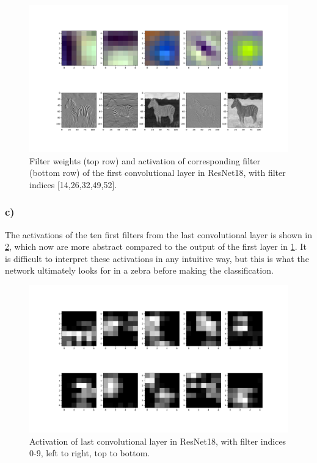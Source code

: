 \begin{figure}[h!]
  \centering
  \includegraphics[clip,trim=4cm 2cm 4cm 2cm, width=\textwidth]{figures/Task4b.pdf}
  \caption{Filter weights (top row) and activation of corresponding filter (bottom row) of the first convolutional layer in ResNet18, with filter indices [14,26,32,49,52].}
  \label{fig:task4:b}
\end{figure}



\subsubsection*{c)}

The activations of the ten first filters from the last convolutional layer is shown in \cref{fig:task4:c}, which now are more abstract compared to the output of the first layer in \cref{fig:task4:b}. It is difficult to interpret these activations in any intuitive way, but this is what the network ultimately looks for in a zebra before making the classification.

\begin{figure}[h!]
  \centering
  \includegraphics[clip,trim=4cm 2cm 4cm 2cm, width=\textwidth]{figures/Task4c.pdf}
  \caption{Activation of last convolutional layer in ResNet18, with filter indices 0-9, left to right, top to bottom.}
  \label{fig:task4:c}
\end{figure}


